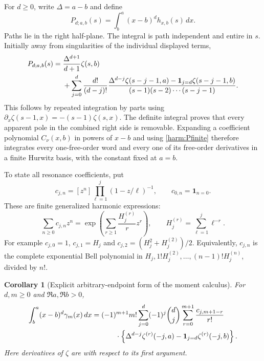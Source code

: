 \documentclass[11pt,a4paper]{article}
\numberwithin{equation}{section}
\newtheorem{corollary}[theorem]{Corollary}
\theoremstyle{definition}
\theoremstyle{remark}
\begin{document}
For $d\ge0$, write $\Delta=a-b$ and define
\begin{equation}
 P_{d;a,b}(s)=\int_b^a(x-b)^d h_{x,b}(s)\,dx.
 \label{harm:Pdef}
\end{equation}
Paths lie in the right half-plane. The integral is path independent and
entire in $s$. Initially away from singularities of the individual
displayed terms,
\begin{align}
 P_{d;a,b}(s)
  ={}&\frac{\Delta^{d+1}}{d+1}\zeta(s,b)\notag\\
   &+\sum_{j=0}^d\frac{d!}{(d-j)!}
     \frac{\Delta^{d-j}\zeta(s-j-1,a)
              -\mathbf1_{j=d}\zeta(s-j-1,b)}
          {(s-1)(s-2)\cdots(s-j-1)}.
 \label{harm:Pfinite}
\end{align}
This follows by repeated integration by parts using
$\partial_x\zeta(s-1,x)=-(s-1)\zeta(s,x)$.
The definite integral proves that every apparent pole in the combined
right side is removable. Expanding a coefficient polynomial
$C_\nu(x,b)$ in powers of $x-b$ and using \eqref{harm:Pfinite}
therefore integrates every one-free-order word and every one of its
free-order derivatives in a finite Hurwitz basis, with the constant
fixed at $a=b$.

To state all resonance coefficients, put
\begin{equation}
 c_{j,n}=[z^n]\prod_{\ell=1}^j(1-z/\ell)^{-1},
 \qquad c_{0,n}=\mathbf1_{n=0}.
 \label{harm:cn}
\end{equation}
These are finite generalized harmonic expressions:
\[
 \sum_{n\ge0}c_{j,n}z^n
     =\exp\left(\sum_{r\ge1}\frac{H_j^{(r)}}r z^r\right),
 \qquad H_j^{(r)}=\sum_{\ell=1}^j\ell^{-r}.
\]
For example $c_{j,0}=1$, $c_{j,1}=H_j$ and
$c_{j,2}=(H_j^2+H_j^{(2)})/2$. Equivalently, $c_{j,n}$ is the
complete exponential Bell polynomial in
$H_j,1!H_j^{(2)},\ldots,(n-1)!H_j^{(n)}$, divided by $n!$.

\begin{corollary}[Explicit arbitrary-endpoint form of the moment calculus]
\label{harm:Stieltjesmoments}
For $d,m\ge0$ and $\Re a,\Re b>0$,
\begin{align}
 \int_b^a(x-b)^d\gamma_m(x)\,dx
   ={}&(-1)^{m+1}m!
        \sum_{j=0}^d(-1)^j\binom dj
        \sum_{r=0}^{m+1}\frac{c_{j,m+1-r}}{r!}\notag\\
      &\hspace{7mm}\cdot
       \left\{\Delta^{d-j}\zeta^{(r)}(-j,a)
                      -\mathbf1_{j=d}\zeta^{(r)}(-j,b)\right\}.
 \label{harm:Stieltjesfinite}
\end{align}
Here derivatives of $\zeta$ are with respect to its first argument.
\end{corollary}
\end{document}
